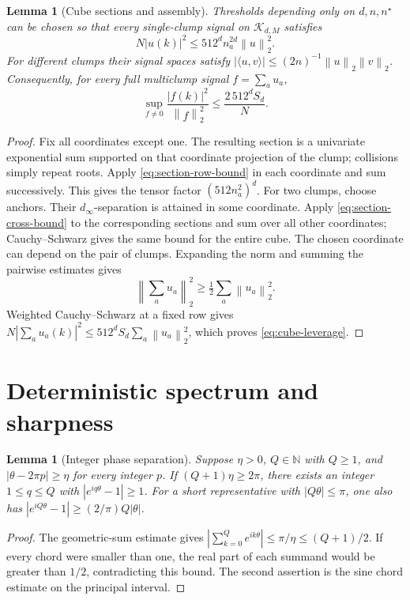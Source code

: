 \documentclass[11pt]{article}
\newtheorem{lemma}[theorem]{Lemma}
\theoremstyle{definition}\newtheorem{definition}[theorem]{Definition}
\theoremstyle{remark}\newtheorem{remark}[theorem]{Remark}
\newcommand{\norm}[1]{\left\lVert#1\right\rVert}
\newcommand{\abs}[1]{\left|#1\right|}
\begin{document}
\begin{lemma}[Cube sections and assembly]\label{lem:cube-clump-leverage}
Thresholds depending only on $d,n,n^\star$ can be chosen so that every
single-clump signal on $\mathcal K_{d,M}$ satisfies
\[
 N\abs{u(k)}^2\le512^d n_a^{2d}\norm{u}_2^2.
\]
For different clumps their signal spaces satisfy
$\abs{\langle u,v\rangle}\le(2n)^{-1}\norm{u}_2\norm{v}_2$.
Consequently, for every full multiclump signal $f=\sum_a u_a$,
\begin{equation}\label{eq:cube-leverage}
 \sup_{f\ne0}\frac{\abs{f(k)}^2}{\norm{f}_2^2}
       \le\frac{2\,512^d S_d}{N}.
\end{equation}
\end{lemma}
\begin{proof}
Fix all coordinates except one. The resulting section is a univariate
exponential sum supported on that coordinate projection of the clump;
collisions simply repeat roots. Apply \eqref{eq:section-row-bound} in
each coordinate and sum successively. This gives the tensor factor
$(512n_a^2)^d$.
For two clumps, choose anchors. Their $d_\infty$-separation is attained in
some coordinate. Apply \eqref{eq:section-cross-bound} to the corresponding
sections and sum over all other coordinates; Cauchy--Schwarz gives the
same bound for the entire cube. The chosen coordinate can depend on the
pair of clumps.
Expanding the norm and summing the pairwise estimates gives
\[
 \norm{\sum_a u_a}_2^2\ge\tfrac12\sum_a\norm{u_a}_2^2.
\]
Weighted Cauchy--Schwarz at a fixed row gives
$N\abs{\sum_a u_a(k)}^2\le512^d S_d\sum_a\norm{u_a}_2^2$,
which proves \eqref{eq:cube-leverage}.
\end{proof}

\section{Deterministic spectrum and sharpness}
\begin{lemma}[Integer phase separation]\label{lem:integer-phase-separation}
Suppose $\eta>0$, $Q\in\mathbb N$ with $Q\ge1$, and
$\abs{\theta-2\pi p}\ge\eta$ for every integer $p$. If
$(Q+1)\eta\ge2\pi$, there exists an integer $1\le q\le Q$ with
$\abs{e^{iq\theta}-1}\ge1$.
For a short representative with $\abs{Q\theta}\le\pi$, one also has
$\abs{e^{iQ\theta}-1}\ge(2/\pi)Q\abs{\theta}$.
\end{lemma}
\begin{proof}
The geometric-sum estimate gives
$\abs{\sum_{k=0}^Q e^{ik\theta}}\le\pi/\eta\le(Q+1)/2$.
If every chord were smaller than one, the real part of each summand would
be greater than $1/2$, contradicting this bound. The second assertion is
the sine chord estimate on the principal interval.
\end{proof}
\end{document}
